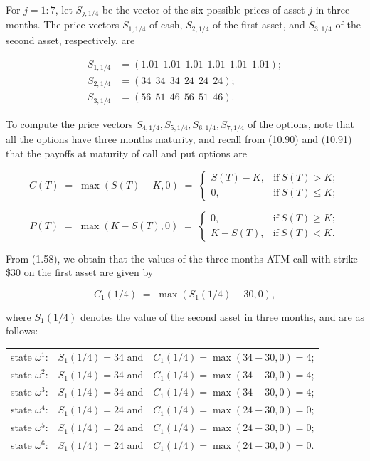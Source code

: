 For $j=1:7$, let $S_{j,1/4}$ be the vector of the six possible prices of
asset $j$ in three months. The price vectors $S_{1,1/4}$ of cash,
$S_{2,1/4}$ of the first asset, and $S_{3,1/4}$ of the second asset,
respectively, are

\begin{align}
S_{1,1/4} &= (1.01\ \ 1.01\ \ 1.01\ \ 1.01\ \ 1.01\ \ 1.01); \\
S_{2,1/4} &= (34\ \ 34\ \ 34\ \ 24\ \ 24\ \ 24); \\
S_{3,1/4} &= (56\ \ 51\ \ 46\ \ 56\ \ 51\ \ 46).
\end{align}

To compute the price vectors $S_{4,1/4}, S_{5,1/4}, S_{6,1/4}, S_{7,1/4}$ of
the options, note that all the options have three months maturity, and
recall from (10.90) and (10.91) that the payoffs at maturity of call and
put options are

\begin{equation}
C(T) \;=\; \max(S(T)-K,0) \;=\; \begin{cases} S(T)-K, & \text{if}\ S(T) > K; \\
0, & \text{if}\ S(T) \le K; \end{cases}
\end{equation}

\begin{equation}
P(T) \;=\; \max(K-S(T),0) \;=\; \begin{cases} 0, & \text{if}\ S(T) \ge K; \\
K-S(T), & \text{if}\ S(T) < K. \end{cases}
\end{equation}

From (1.58), we obtain that the values of the three months ATM call with
strike \$30 on the first asset are given by

\[
C_1(1/4) \;=\; \max(S_1(1/4)-30,0),
\]

where $S_1(1/4)$ denotes the value of the second asset in three months,
and are as follows:

\begin{center}
\begin{tabular}{lll}
state $\omega^1$: & $S_1(1/4)=34$ and & $C_1(1/4)=\max(34-30,0)=4$; \\
state $\omega^2$: & $S_1(1/4)=34$ and & $C_1(1/4)=\max(34-30,0)=4$; \\
state $\omega^3$: & $S_1(1/4)=34$ and & $C_1(1/4)=\max(34-30,0)=4$; \\
state $\omega^4$: & $S_1(1/4)=24$ and & $C_1(1/4)=\max(24-30,0)=0$; \\
state $\omega^5$: & $S_1(1/4)=24$ and & $C_1(1/4)=\max(24-30,0)=0$; \\
state $\omega^6$: & $S_1(1/4)=24$ and & $C_1(1/4)=\max(24-30,0)=0$. \\
\end{tabular}
\end{center}

